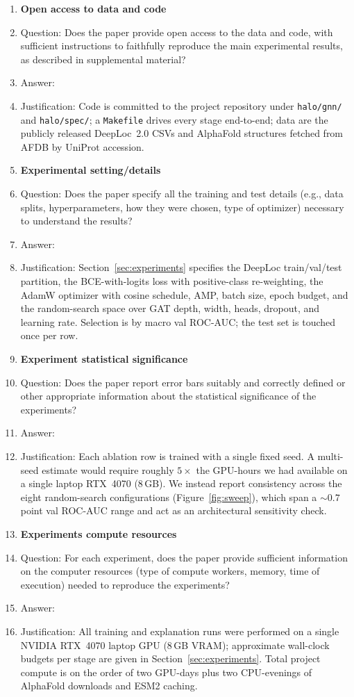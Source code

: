 \begin{enumerate}
\item {\bf Open access to data and code}
    \item[] Question: Does the paper provide open access to the data and code, with sufficient instructions to faithfully reproduce the main experimental results, as described in supplemental material?
    \item[] Answer: \answerYes{}
    \item[] Justification: Code is committed to the project repository under
    \texttt{halo/gnn/} and \texttt{halo/spec/}; a \texttt{Makefile} drives every
    stage end-to-end; data are the publicly released DeepLoc~2.0 CSVs and
    AlphaFold structures fetched from AFDB by UniProt accession.

\item {\bf Experimental setting/details}
    \item[] Question: Does the paper specify all the training and test details (e.g., data splits, hyperparameters, how they were chosen, type of optimizer) necessary to understand the results?
    \item[] Answer: \answerYes{}
    \item[] Justification: Section~\ref{sec:experiments} specifies the DeepLoc
    train/val/test partition, the BCE-with-logits loss with positive-class
    re-weighting, the AdamW optimizer with cosine schedule, AMP, batch size,
    epoch budget, and the random-search space over GAT depth, width, heads,
    dropout, and learning rate. Selection is by macro val ROC-AUC; the test
    set is touched once per row.

\item {\bf Experiment statistical significance}
    \item[] Question: Does the paper report error bars suitably and correctly defined or other appropriate information about the statistical significance of the experiments?
    \item[] Answer: \answerNo{}
    \item[] Justification: Each ablation row is trained with a single fixed seed.
    A multi-seed estimate would require roughly $5\times$ the GPU-hours we had
    available on a single laptop RTX~4070 (8\,GB). We instead report
    consistency across the eight random-search configurations
    (Figure~\ref{fig:sweep}), which span a $\sim\!0.7$ point val ROC-AUC range
    and act as an architectural sensitivity check.

\item {\bf Experiments compute resources}
    \item[] Question: For each experiment, does the paper provide sufficient information on the computer resources (type of compute workers, memory, time of execution) needed to reproduce the experiments?
    \item[] Answer: \answerYes{}
    \item[] Justification: All training and explanation runs were performed on a
    single NVIDIA RTX~4070 laptop GPU (8\,GB VRAM); approximate wall-clock
    budgets per stage are given in Section~\ref{sec:experiments}. Total
    project compute is on the order of two GPU-days plus two CPU-evenings of
    AlphaFold downloads and ESM2 caching.


\end{enumerate}
